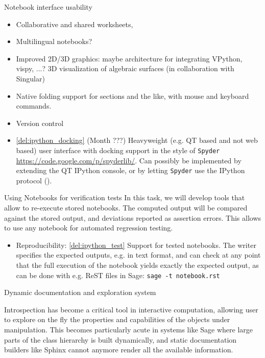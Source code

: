 \begin{Workpackage}{\thewpno}
\begin{task}{Notebook interface usability}

  \begin{itemize}
  \item Collaborative and shared worksheets,
  \item Multilingual notebooks?
  \item Improved 2D/3D graphics: maybe architecture for integrating
    VPython, vispy, ...? 3D visualization of algebraic surfaces (in
    collaboration with Singular)
  \item Native folding support for sections and the like, with mouse
    and keyboard commands.
  \item Version control
  \item \ref{del:ipython_docking} (Month ???) Heavyweight (e.g. QT
    based and not web based) user interface with docking support in
    the style of \texttt{Spyder}
    \url{https://code.google.com/p/spyderlib/}. Can possibly be
    implemented by extending the QT IPython console, or by letting
    \texttt{Spyder} use the IPython protocol ().
  \end{itemize}
\end{task}


\begin{task}{Using Notebooks for verification tests}
  In this task, we will develop tools that allow to re-execute stored
  notebooks. The computed output will be compared against the stored
  output, and deviations reported as assertion errors. This allows to
  use any notebook for automated regression testing.

  \begin{itemize}
  \item Reproducibility: \ref{del:ipython_test} Support for tested
    notebooks. The writer specifies the expected outputs, e.g. in text
    format, and can check at any point that the full execution of the
    notebook yields exactly the expected output, as can be done with
    e.g. ReST files in Sage: \lstinline{sage -t notebook.rst}
  \end{itemize}
\end{task}

\begin{task}{Dynamic documentation and exploration system}

  Introspection has become a critical tool in interactive computation,
  allowing user to explore on the fly the properties and capabilities
  of the objects under manipulation. This becomes particularly acute
  in systems like Sage where large parts of the class hierarchy is
  built dynamically, and static documentation builders like Sphinx
  cannot anymore render all the available information.


\end{task}
\end{Workpackage}
